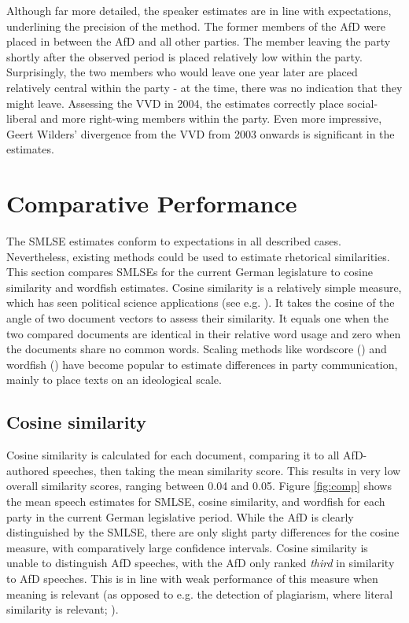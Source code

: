\documentclass{article}
\begin{document}
Although far more detailed, the speaker estimates are in line with expectations, underlining the precision of the method. The former members of the AfD were placed in between the AfD and all other parties. The member leaving the party shortly after the observed period is placed relatively low within the party. Surprisingly, the two members who would leave one year later are placed relatively central within the party - at the time, there was no indication that they might leave. Assessing the VVD in 2004, the estimates correctly place social-liberal and more right-wing members within the party. Even more impressive, Geert Wilders' divergence from the VVD from 2003 onwards is significant in the estimates.\par 



\section{Comparative Performance}
The SMLSE estimates conform to expectations in all described cases. Nevertheless, existing methods could be used to estimate rhetorical similarities. This section compares SMLSEs for the current German legislature to cosine similarity and wordfish estimates. Cosine similarity is a relatively simple measure, which has seen political science applications (see e.g. \cite{Similarity2007a, Hager2020}). It takes the cosine of the angle of two document vectors to assess their similarity. It equals one when the two compared documents are identical in their relative word usage and zero when the documents share no common words. Scaling methods like wordscore (\cite{Laver2003}) and wordfish (\cite{Slapin2008}) have become popular to estimate differences in party communication, mainly to place texts on an ideological scale. \par

\subsection{Cosine similarity}

Cosine similarity is calculated for each document, comparing it to all AfD-authored speeches, then taking the mean similarity score. This results in very low overall similarity scores, ranging between 0.04 and 0.05. Figure \ref{fig:comp} shows the mean speech estimates for SMLSE, cosine similarity, and wordfish for each party in the current German legislative period. While the AfD is clearly distinguished by the SMLSE, there are only slight party differences for the cosine measure, with comparatively large confidence intervals. Cosine similarity is unable to distinguish AfD speeches, with the AfD only ranked \textit{third} in similarity to AfD speeches. This is in line with weak performance of this measure when meaning is relevant (as opposed to e.g. the detection of plagiarism, where literal similarity is relevant; \cite{Prasetya2018}).\par
\end{document}
